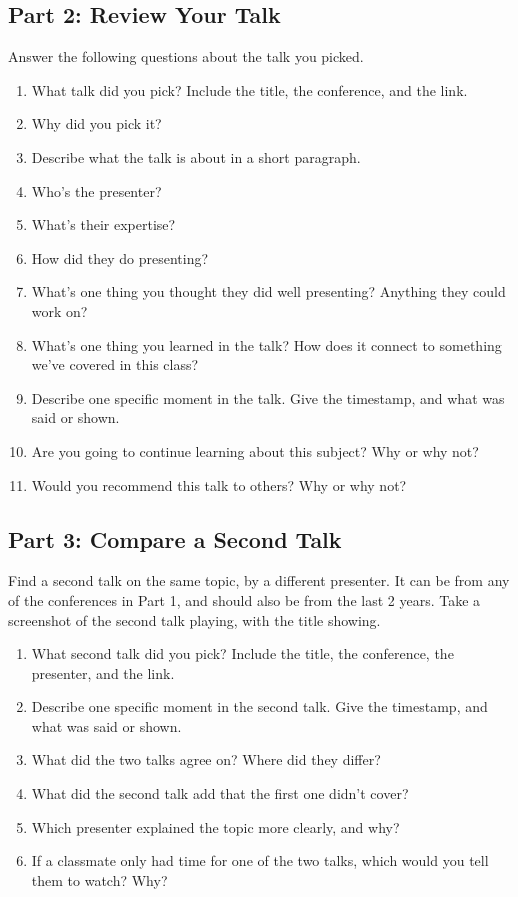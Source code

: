 \documentclass[12pt]{article}
\begin{document}
\subsection*{Part 2: Review Your Talk}
Answer the following questions about the talk you picked.
\begin{enumerate}
    \item What talk did you pick? Include the title, the conference, and the link.
    \item Why did you pick it?
    \item Describe what the talk is about in a short paragraph.
    \item Who's the presenter?
    \item What's their expertise?
    \item How did they do presenting?
    \item What's one thing you thought they did well presenting? Anything they could work on?
    \item What's one thing you learned in the talk? How does it connect to something we've covered in this class?
    \item Describe one specific moment in the talk. Give the timestamp, and what was said or shown.
    \item Are you going to continue learning about this subject? Why or why not?
    \item Would you recommend this talk to others? Why or why not?
\end{enumerate}

\subsection*{Part 3: Compare a Second Talk}
Find a second talk on the same topic, by a different presenter. It can be from any of the conferences in Part 1, and should also be from the last 2 years. Take a screenshot of the second talk playing, with the title showing.
\begin{enumerate}[start=12]
    \item What second talk did you pick? Include the title, the conference, the presenter, and the link.
    \item Describe one specific moment in the second talk. Give the timestamp, and what was said or shown.
    \item What did the two talks agree on? Where did they differ?
    \item What did the second talk add that the first one didn't cover?
    \item Which presenter explained the topic more clearly, and why?
    \item If a classmate only had time for one of the two talks, which would you tell them to watch? Why?
\end{enumerate}
\end{document}

